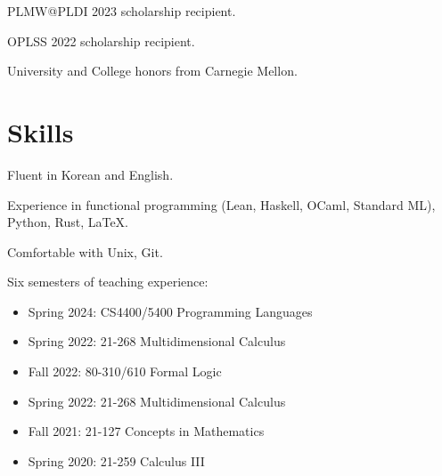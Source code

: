 \documentclass[12pt]{article}
\begin{document}
PLMW@PLDI 2023 scholarship recipient.

OPLSS 2022 scholarship recipient.

University and College honors from Carnegie Mellon.

\section{Skills}

Fluent in Korean and English.

Experience in functional programming (Lean, Haskell, OCaml, Standard ML), Python, Rust, LaTeX.

Comfortable with Unix, Git.

Six semesters of teaching experience:
\begin{itemize}
    \item Spring 2024: CS4400/5400 Programming Languages
    \item Spring 2022: 21-268 Multidimensional Calculus
    \item Fall 2022: 80-310/610 Formal Logic
    \item Spring 2022: 21-268 Multidimensional Calculus
    \item Fall 2021: 21-127 Concepts in Mathematics
    \item Spring 2020: 21-259 Calculus III
\end{itemize}
\end{document}
